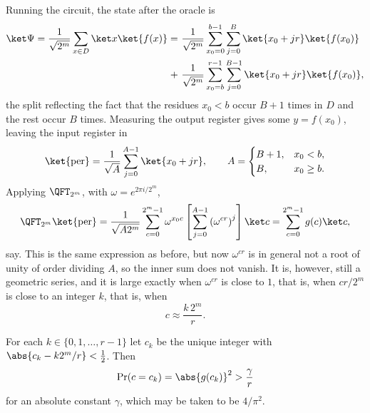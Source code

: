 \begin{center}
\end{center}

Running the circuit, the state after the oracle is
\begin{align*}
	\ket\Psi = \frac1{\sqrt{2^m}}\sum_{x\in D}\ket x\ket{f(x)} = \ &\frac1{\sqrt{2^m}}\sum_{x_0=0}^{b-1}\sum_{j=0}^{B}\ket{x_0+jr}\ket{f(x_0)}\\
	+\ &\frac1{\sqrt{2^m}}\sum_{x_0=b}^{r-1}\sum_{j=0}^{B-1}\ket{x_0+jr}\ket{f(x_0)},
\end{align*}
the split reflecting the fact that the residues $x_0<b$ occur $B+1$ times in $D$ and the rest occur $B$ times. Measuring the output register gives some $y = f(x_0)$, leaving the input register in
$$\ket{\mathrm{per}} = \frac1{\sqrt A}\sum_{j=0}^{A-1}\ket{x_0+jr}, \qquad A = \begin{cases} B+1, & x_0<b,\\ B,&x_0\geq b.\end{cases}$$
Applying $\QFT_{2^m}$, with $\omega = e^{2\pi i/2^m}$,
$$\QFT_{2^m}\ket{\mathrm{per}} = \frac{1}{\sqrt{A2^m}}\sum_{c=0}^{2^m-1}\omega^{x_0c}\left[\sum_{j=0}^{A-1}\left(\omega^{cr}\right)^j\right]\ket c = \sum_{c=0}^{2^m-1}g(c)\ket c,$$
say. This is the same expression as before, but now $\omega^{cr}$ is in general not a root of unity of order dividing $A$, so the inner sum does not vanish. It is, however, still a geometric series, and it is large exactly when $\omega^{cr}$ is close to $1$, that is, when $cr/2^m$ is close to an integer $k$, that is, when
$$c \approx \frac{k\,2^m}{r}.$$

\begin{theorem}
	For each $k\in\{0,1,\dots,r-1\}$ let $c_k$ be the unique integer with $\abs{c_k - k2^m/r}<\tfrac12$. Then
	$$\Pr(c = c_k) = \abs{g(c_k)}^2 > \frac{\gamma}{r}$$
	for an absolute constant $\gamma$, which may be taken to be $4/\pi^2$.
\end{theorem}

